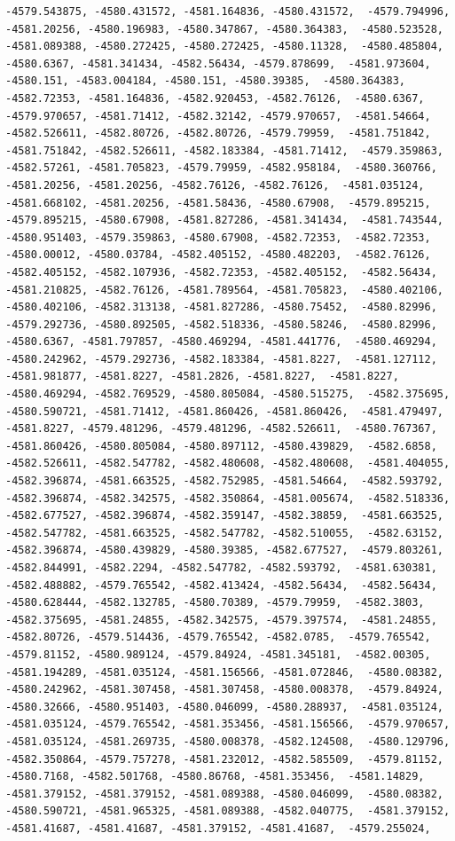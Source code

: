 \documentclass[
]{article}
\begin{document}
\begin{verbatim}
-4579.543875, -4580.431572, -4581.164836, -4580.431572,  -4579.794996, -4581.20256, -4580.196983, -4580.347867, -4580.364383,  -4580.523528, -4581.089388, -4580.272425, -4580.272425, -4580.11328,  -4580.485804, -4580.6367, -4581.341434, -4582.56434, -4579.878699,  -4581.973604, -4580.151, -4583.004184, -4580.151, -4580.39385,  -4580.364383, -4582.72353, -4581.164836, -4582.920453, -4582.76126,  -4580.6367, -4579.970657, -4581.71412, -4582.32142, -4579.970657,  -4581.54664, -4582.526611, -4582.80726, -4582.80726, -4579.79959,  -4581.751842, -4581.751842, -4582.526611, -4582.183384, -4581.71412,  -4579.359863, -4582.57261, -4581.705823, -4579.79959, -4582.958184,  -4580.360766, -4581.20256, -4581.20256, -4582.76126, -4582.76126,  -4581.035124, -4581.668102, -4581.20256, -4581.58436, -4580.67908,  -4579.895215, -4579.895215, -4580.67908, -4581.827286, -4581.341434,  -4581.743544, -4580.951403, -4579.359863, -4580.67908, -4582.72353,  -4582.72353, -4580.00012, -4580.03784, -4582.405152, -4580.482203,  -4582.76126, -4582.405152, -4582.107936, -4582.72353, -4582.405152,  -4582.56434, -4581.210825, -4582.76126, -4581.789564, -4581.705823,  -4580.402106, -4580.402106, -4582.313138, -4581.827286, -4580.75452,  -4580.82996, -4579.292736, -4580.892505, -4582.518336, -4580.58246,  -4580.82996, -4580.6367, -4581.797857, -4580.469294, -4581.441776,  -4580.469294, -4580.242962, -4579.292736, -4582.183384, -4581.8227,  -4581.127112, -4581.981877, -4581.8227, -4581.2826, -4581.8227,  -4581.8227, -4580.469294, -4582.769529, -4580.805084, -4580.515275,  -4582.375695, -4580.590721, -4581.71412, -4581.860426, -4581.860426,  -4581.479497, -4581.8227, -4579.481296, -4579.481296, -4582.526611,  -4580.767367, -4581.860426, -4580.805084, -4580.897112, -4580.439829,  -4582.6858, -4582.526611, -4582.547782, -4582.480608, -4582.480608,  -4581.404055, -4582.396874, -4581.663525, -4582.752985, -4581.54664,  -4582.593792, -4582.396874, -4582.342575, -4582.350864, -4581.005674,  -4582.518336, -4582.677527, -4582.396874, -4582.359147, -4582.38859,  -4581.663525, -4582.547782, -4581.663525, -4582.547782, -4582.510055,  -4582.63152, -4582.396874, -4580.439829, -4580.39385, -4582.677527,  -4579.803261, -4582.844991, -4582.2294, -4582.547782, -4582.593792,  -4581.630381, -4582.488882, -4579.765542, -4582.413424, -4582.56434,  -4582.56434, -4580.628444, -4582.132785, -4580.70389, -4579.79959,  -4582.3803, -4582.375695, -4581.24855, -4582.342575, -4579.397574,  -4581.24855, -4582.80726, -4579.514436, -4579.765542, -4582.0785,  -4579.765542, -4579.81152, -4580.989124, -4579.84924, -4581.345181,  -4582.00305, -4581.194289, -4581.035124, -4581.156566, -4581.072846,  -4580.08382, -4580.242962, -4581.307458, -4581.307458, -4580.008378,  -4579.84924, -4580.32666, -4580.951403, -4580.046099, -4580.288937,  -4581.035124, -4581.035124, -4579.765542, -4581.353456, -4581.156566,  -4579.970657, -4581.035124, -4581.269735, -4580.008378, -4582.124508,  -4580.129796, -4582.350864, -4579.757278, -4581.232012, -4582.585509,  -4579.81152, -4580.7168, -4582.501768, -4580.86768, -4581.353456,  -4581.14829, -4581.379152, -4581.379152, -4581.089388, -4580.046099,  -4580.08382, -4580.590721, -4581.965325, -4581.089388, -4582.040775,  -4581.379152, -4581.41687, -4581.41687, -4581.379152, -4581.41687,  -4579.255024, 
\end{verbatim}
\end{document}
